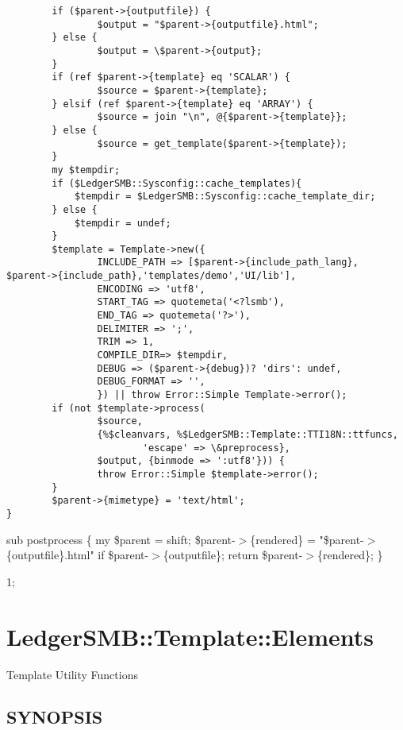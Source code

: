 \begin{description}
\begin{description}
\begin{description}
\begin{description}
\begin{description}
\begin{description}
\begin{description}
\begin{description}
\begin{description}
\begin{description}
\begin{verbatim}
        if ($parent->{outputfile}) {
                $output = "$parent->{outputfile}.html";
        } else {
                $output = \$parent->{output};
        }
        if (ref $parent->{template} eq 'SCALAR') {
                $source = $parent->{template};
        } elsif (ref $parent->{template} eq 'ARRAY') {
                $source = join "\n", @{$parent->{template}};
        } else {
                $source = get_template($parent->{template});
        }
        my $tempdir;
        if ($LedgerSMB::Sysconfig::cache_templates){
            $tempdir = $LedgerSMB::Sysconfig::cache_template_dir;
        } else {
            $tempdir = undef;
        }
        $template = Template->new({
                INCLUDE_PATH => [$parent->{include_path_lang}, $parent->{include_path},'templates/demo','UI/lib'],
                ENCODING => 'utf8',
                START_TAG => quotemeta('<?lsmb'),
                END_TAG => quotemeta('?>'),
                DELIMITER => ';',
                TRIM => 1,
                COMPILE_DIR=> $tempdir,
                DEBUG => ($parent->{debug})? 'dirs': undef,
                DEBUG_FORMAT => '',
                }) || throw Error::Simple Template->error(); 
        if (not $template->process(
                $source, 
                {%$cleanvars, %$LedgerSMB::Template::TTI18N::ttfuncs,
                        'escape' => \&preprocess},
                $output, {binmode => ':utf8'})) {
                throw Error::Simple $template->error();
        }
        $parent->{mimetype} = 'text/html';
}
\end{verbatim}


sub postprocess \{
    my \$parent = shift;
    \$parent-$>$\{rendered\} = "\$parent-$>$\{outputfile\}.html" if \$parent-$>$\{outputfile\};
    return \$parent-$>$\{rendered\};
\}



1;

\section{LedgerSMB::Template::Elements\label{LedgerSMB::Template::Elements}}


Template Utility Functions

\subsection*{SYNOPSIS\label{LedgerSMB::Template::Elements_SYNOPSIS}}



\end{description}
\end{description}
\end{description}
\end{description}
\end{description}
\end{description}
\end{description}
\end{description}
\end{description}
\end{description}
